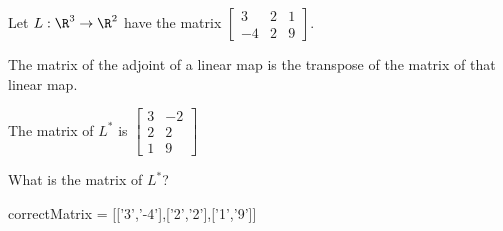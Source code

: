 \documentclass{ximera}
\begin{document}
\begin{question}
	Let $L:\R^3 \to \R^2$ have the matrix \(\begin{bmatrix} 3&2 &1\\ -4&2&9\end{bmatrix}\).
	\begin{solution}
		\begin{hint}
			The matrix of the adjoint of a linear map is the transpose of the matrix of that linear map.
		\end{hint}
		\begin{hint}
			The matrix of $L^*$ is \(\begin{bmatrix} 3&-2\\ 2&2\\1&9\end{bmatrix}\)
		\end{hint}
		What is the matrix of $L^*$?
			\begin{matrix-answer}
				correctMatrix = [['3','-4'],['2','2'],['1','9']]
			\end{matrix-answer}
	\end{solution}
\end{question}
\end{document}
